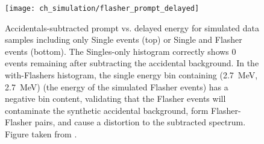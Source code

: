 \begin{figure}
    \centering
    \texttt{[image: ch\_simulation/flasher\_prompt\_delayed]}
    \caption{
        Accidentals-subtracted prompt vs. delayed energy for simulated data samples
        including only Single events (top) or Single and Flasher events (bottom).
        The Singles-only histogram correctly shows 0 events remaining
        after subtracting the accidental background.
        In the with-Flashers histogram,
        the single energy bin containing (\SI{2.7}{\MeV}, \SI{2.7}{\MeV})
        (the energy of the simulated Flasher events)
        has a negative bin content,
        validating that the Flasher events
        will contaminate the synthetic accidental background,
        form Flasher-Flasher pairs, and cause a distortion to the subtracted spectrum.
        Figure taken from \cite{flasher_sim}.
    }
    \label{fig:sim_flasher_prompt_delayed}
\end{figure}





